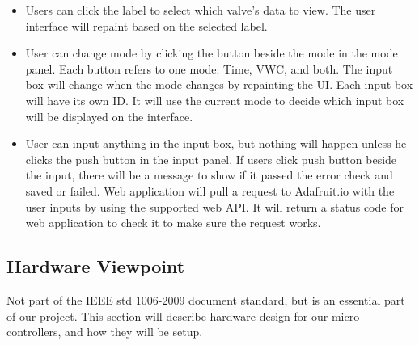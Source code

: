 \documentclass[onecolumn, draftclsnofoot,10pt, compsoc]{IEEEtran}
\newcounter{subsubsubsection}[subsubsection]
\begin{document}
	\begin{itemize}
		\item Users can click the label to select which valve’s data to view. The user interface will repaint based on the selected label.
		\item  User can change mode by clicking the button beside the mode in the mode panel. Each button refers to one mode: Time, VWC, and both. The input box will change when the mode changes by repainting the UI. Each input box will have its own ID. It will use the current mode to decide which input box will be displayed on the interface.
		\item User can input anything in the input box, but nothing will happen unless he clicks the push button in the input panel. If users click push button beside the input, there will be a message to show if it passed the error check and saved or failed. Web application will pull a request to Adafruit.io with the user inputs by using the supported web API. It will return a status code for web application to check it to make sure the request works. 
	\end{itemize}
	
	
	\subsection{Hardware Viewpoint}
	Not part of the IEEE std 1006-2009 document standard, but is an essential part of our project.
	This section will describe hardware design for our micro-controllers, and how they will be setup. 
\end{document}
